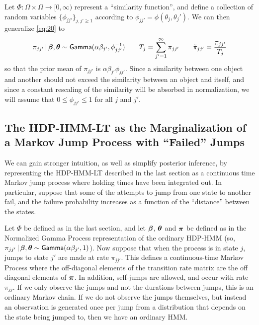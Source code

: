 Let $\Phi: \Omega \times \Omega \to [0,\infty)$ represent a
``similarity function'', and define a collection of random variables
$\{\phi_{jj'}\}_{j,j' \geq 1}$ according to $\phi_{jj'} = \phi(\theta_j, \theta_j')$.
We can then generalize \eqref{eq:20} to
\begin{align}
  \pi_{jj'} \, \vert \, \boldsymbol{\beta}, \boldsymbol{\theta} \sim \mathsf{Gamma}(\alpha \beta_{j'},\phi_{jj'}^{-1}) \qquad
  T_j = \sum_{j'=1}^{\infty} \pi_{jj'} \qquad \tilde{\pi}_{jj'} = \frac{\pi_{jj'}}{T_j}
\end{align}
so that the prior mean of $\pi_{jj'}$ is
$\alpha\beta_{j'}\phi_{jj'}$.  Since a similarity between one object
and another should not exceed the similarity between an object and
itself, and since a constant rescaling of the similarity will be
absorbed in normalization, we will assume that $0 \leq \phi_{jj'} \leq 1$ for all $j$
and $j'$.

\subsection{The HDP-HMM-LT as the Marginalization of
a Markov Jump Process with ``Failed'' Jumps}
\label{sec:dist-based-filt}

We can gain stronger intuition, as well as simplify posterior
inference, by representing the HDP-HMM-LT described in the last section
as a continuous time Markov jump process where holding times have been
integrated out.  In particular, suppose that some of the attempts to jump
from one state to another fail, and the failure probability
increases as a function of the ``distance'' between the states.

Let $\Phi$ be defined as in the last section, and let 
$\boldsymbol{\beta}$, $\boldsymbol{\theta}$ and $\boldsymbol{\pi}$ be defined as in the Normalized Gamma
Process representation of the ordinary HDP-HMM (so,
  $\pi_{jj'} \, \vert \, \boldsymbol{\beta}, \boldsymbol{\theta} \sim \mathsf{Gamma}(\alpha \beta_{j'},1)$).
Now suppose that when the process is in state $j$, jumps to state
$j'$ are made at rate $\pi_{jj'}$.  This defines a continuous-time
Markov Process where the off-diagonal elements of the transition rate
matrix are the off diagonal elements of $\boldsymbol{\pi}$.  In addition,
self-jumps are allowed, and occur with rate $\pi_{jj}$.   If we only
observe the jumps and not the durations between jumps, this is an
ordinary Markov chain.  If we do not observe the jumps themselves, but
instead an observation is generated once per jump from a distribution that depends
on the state being jumped to, then we have an ordinary HMM.

